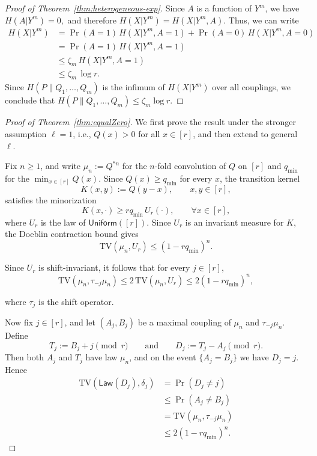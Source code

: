 \documentclass[journal]{IEEEtran}
\newcommand{\TV}{\mathrm{TV}}
\newcommand{\1}{\mathbf{1}}
\begin{document}
\begin{proof}[Proof of Theorem~\ref{thm:heterogeneous-exp}]
Since $A$ is a function of $Y^m$, we have $H(A| Y^m)=0,$ and therefore $H(X| Y^m) = H(X| Y^m,A)$. Thus, we can write
\begin{align*}
H(X| Y^m) &=\Pr(A=1)\,H(X| Y^m,A=1) +\Pr(A=0)\,H(X| Y^m,A=0)\\
& = \Pr(A=1)\,H(X| Y^m,A=1)\\
& \leq  \zeta_m \, H(X| Y^m,A=1)\\
& \leq  \zeta_m \, \log r.
\end{align*}
Since $H(P\|Q_1,\dots,Q_m)$ is the infimum of $H(X| Y^m)$ over all couplings, we conclude that
\(H(P\|Q_1,\dots,Q_m)\le \zeta_m\log r.\)


\end{proof}

\begin{proof}[Proof of Theorem~\ref{thm:equalZero}]
We first prove the result under the stronger assumption $\ell=1$, i.e., $Q(x)>0$ for all $x\in[r]$, and then extend to general $\ell$.

Fix $n\ge 1$, and write $\mu_n:=Q^{*n}$ for the $n$-fold convolution of $Q$ on $[r]$ and $q_{\min}$ for the $\min_{x\in [r]} Q(x)$. Since $Q(x)\ge q_{\min}$ for every $x$, the transition kernel
\[
K(x,y):=Q(y-x), \qquad x,y\in[r],
\]
satisfies the minorization
\[
K(x,\cdot)\ge rq_{\min}\,U_r(\cdot),
\qquad\forall x\in[r],
\]
where $U_r$ is the law of $\mathsf{Uniform}([r])$.
Since $U_r$ is an invariant measure for $K$, the Doeblin contraction bound gives
\[
\TV(\mu_n,U_r)\le (1-rq_{\min})^n.
\]

Since $U_r$ is shift-invariant, it follows that for every $j\in[r]$,
\begin{equation}\label{eq:couplingproof1}
  \TV(\mu_n,\tau_{-j}\mu_n)
\le 2\,\TV(\mu_n,U_r)
\le 2(1-rq_{\min})^n,  
\end{equation}

where $\tau_{j}$ is the shift operator.

Now fix $j\in[r]$, and let $(A_j,B_j)$ be a maximal coupling of $\mu_n$ and $\tau_{-j}\mu_n$.
Define
\[
T_j:=B_j+j \pmod r
\qquad \text{and} \qquad
D_j:=T_j-A_j \pmod r.
\]
Then both $A_j$ and $T_j$ have law $\mu_n$, and on the event $\{A_j=B_j\}$ we have $D_j=j$.
Hence
\begin{align*}
\TV(\mathsf{Law}(D_j),\delta_j)
&= \Pr(D_j \neq j)\\
&\le \Pr(A_j\neq B_j)\\
&= \TV(\mu_n,\tau_{-j}\mu_n)\\
&\le 2(1-rq_{\min})^n.
\end{align*}


\end{proof}
\end{document}
